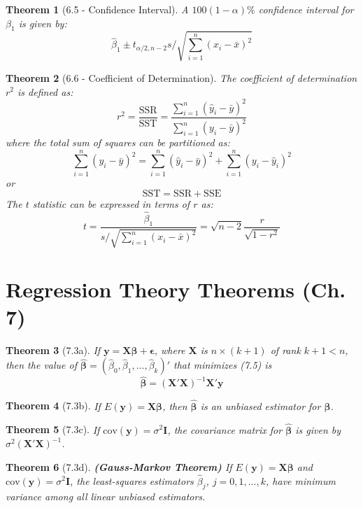 \documentclass{article}
\newtheorem{theorem}{Theorem}[section]
\begin{document}
\begin{theorem}[6.5 - Confidence Interval]
A $100(1-\alpha)\%$ confidence interval for $\beta_1$ is given by:
\[\hat{\beta}_1 \pm t_{\alpha/2, n-2}s/\sqrt{\sum_{i=1}^n (x_i - \bar{x})^2}\]
\end{theorem}

\begin{theorem}[6.6 - Coefficient of Determination]
The coefficient of determination $r^2$ is defined as:
\[r^2 = \frac{\text{SSR}}{\text{SST}} = \frac{\sum_{i=1}^n (\hat{y}_i - \bar{y})^2}{\sum_{i=1}^n (y_i - \bar{y})^2}\]
where the total sum of squares can be partitioned as:
\[\sum_{i=1}^n (y_i - \bar{y})^2 = \sum_{i=1}^n (\hat{y}_i - \bar{y})^2 + \sum_{i=1}^n (y_i - \hat{y}_i)^2\]
or
\[\text{SST} = \text{SSR} + \text{SSE}\]
The $t$ statistic can be expressed in terms of $r$ as:
\[t = \frac{\hat{\beta}_1}{s/\sqrt{\sum_{i=1}^n (x_i - \bar{x})^2}} = \sqrt{n-2}\frac{r}{\sqrt{1-r^2}}\]
\end{theorem}

\section{Regression Theory Theorems (Ch. 7)}

\begin{theorem}[7.3a]
If $\mathbf{y} = \mathbf{X}\boldsymbol{\beta} + \boldsymbol{\epsilon}$, where $\mathbf{X}$ is $n \times (k+1)$ of rank $k+1 < n$, then the value of $\hat{\boldsymbol{\beta}} = (\hat{\beta}_0, \hat{\beta}_1, \ldots, \hat{\beta}_k)'$ that minimizes (7.5) is
\[\hat{\boldsymbol{\beta}} = (\mathbf{X}'\mathbf{X})^{-1}\mathbf{X}'\mathbf{y}\]
\end{theorem}

\begin{theorem}[7.3b]
If $E(\mathbf{y}) = \mathbf{X}\boldsymbol{\beta}$, then $\hat{\boldsymbol{\beta}}$ is an unbiased estimator for $\boldsymbol{\beta}$.
\end{theorem}

\begin{theorem}[7.3c]
If $\text{cov}(\mathbf{y}) = \sigma^2\mathbf{I}$, the covariance matrix for $\hat{\boldsymbol{\beta}}$ is given by $\sigma^2(\mathbf{X}'\mathbf{X})^{-1}$.
\end{theorem}

\begin{theorem}[7.3d] \textbf{(Gauss-Markov Theorem)}
If $E(\mathbf{y}) = \mathbf{X}\boldsymbol{\beta}$ and $\text{cov}(\mathbf{y}) = \sigma^2\mathbf{I}$, the least-squares estimators $\hat{\beta}_j$, $j = 0, 1, \ldots, k$, have minimum variance among all linear unbiased estimators.
\end{theorem}
\end{document}
